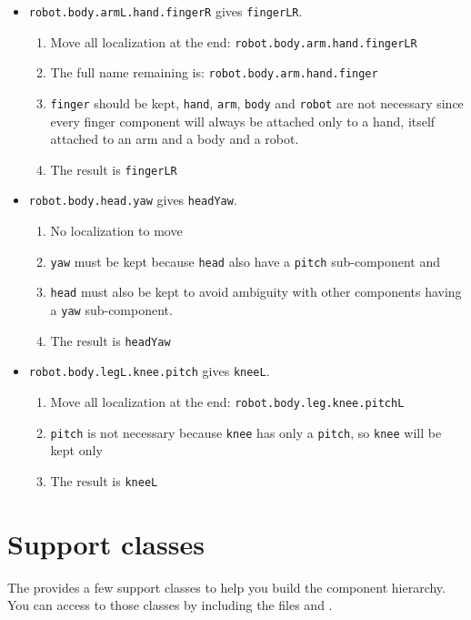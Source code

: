 \begin{itemize}

\item \lstinline{robot.body.armL.hand.fingerR} gives \lstinline{fingerLR}.
  \begin{enumerate}
  \item Move all localization at the end:
    \lstinline{robot.body.arm.hand.fingerLR}
  \item The full name remaining is: \lstinline{robot.body.arm.hand.finger}
  \item \lstinline{finger} should be kept, \lstinline{hand},
    \lstinline{arm}, \lstinline{body} and \lstinline{robot} are not
    necessary since every finger component will always be attached only to a
    hand, itself attached to an arm and a body and a robot.
  \item The result is \lstinline{fingerLR}
  \end{enumerate}

\item \lstinline{robot.body.head.yaw} gives \lstinline{headYaw}.
  \begin{enumerate}
  \item No localization to move
  \item \lstinline{yaw} must be kept because \lstinline{head} also have a
    \lstinline{pitch} sub-component and
  \item \lstinline{head} must also be kept to avoid ambiguity with other
    components having a \lstinline{yaw} sub-component.
  \item The result is \lstinline{headYaw}
  \end{enumerate}

\item \lstinline{robot.body.legL.knee.pitch} gives \lstinline{kneeL}.
  \begin{enumerate}
  \item Move all localization at the end:
    \lstinline{robot.body.leg.knee.pitchL}
  \item \lstinline{pitch} is not necessary because \lstinline{knee} has only
    a \lstinline{pitch}, so \lstinline{knee} will be kept only
  \item The result is \lstinline{kneeL}
  \end{enumerate}
\end{itemize}

\section{Support classes}
The \usdk provides a few support \us classes to help you build the component
hierarchy.  You can access to those classes by including the files
 and .


